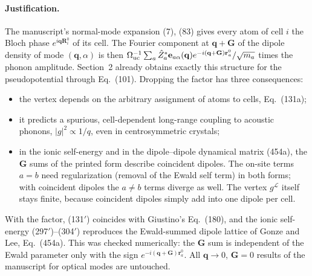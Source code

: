 \paragraph{Justification.}
The manuscript's normal-mode expansion (7), (83) gives every atom of cell $i$ the Bloch phase $e^{i\mathbf q\mathbf R^0_i}$ of its cell. The Fourier component at $\mathbf q+\mathbf G$ of the dipole density of mode $(\mathbf q,\alpha)$ is then $\Omega_{\rm uc}^{-1}\sum_a\hat Z^*_a\mathbf e_{a\alpha}(\mathbf q)e^{-i(\mathbf q+\mathbf G)\mathbf r^0_a}/\sqrt{m_a}$ times the phonon amplitude. Section~2 already obtains exactly this structure for the pseudopotential through Eq.~(101). Dropping the factor has three consequences:
\begin{itemize}
\item the vertex depends on the arbitrary assignment of atoms to cells, Eq.~(131a);
\item it predicts a spurious, cell-dependent long-range coupling to acoustic phonons, $|g|^2\propto1/q$, even in centrosymmetric crystals;
\item in the ionic self-energy and in the dipole--dipole dynamical matrix (454a), the $\mathbf G$ sums of the printed form describe coincident dipoles. The on-site terms $a=b$ need regularization (removal of the Ewald self term) in both forms; with coincident dipoles the $a\neq b$ terms diverge as well. The vertex $g^{\mathcal L}$ itself stays finite, because coincident dipoles simply add into one dipole per cell.
\end{itemize}
With the factor, (131$'$) coincides with Giustino's Eq.~(180), and the ionic self-energy (297$'$)--(304$'$) reproduces the Ewald-summed dipole lattice of Gonze and Lee, Eq.~(454a). This was checked numerically: the $\mathbf G$ sum is independent of the Ewald parameter only with the sign $e^{-i(\mathbf q+\mathbf G)\mathbf r^0_a}$. All $\mathbf q\to0$, $\mathbf G=0$ results of the manuscript for optical modes are untouched.
